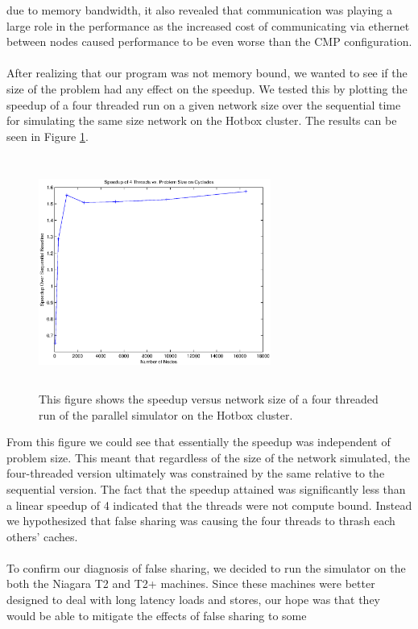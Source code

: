 \documentclass[twocolumn]{article}
\begin{document}
due to memory bandwidth, it also revealed that communication was playing a
large role in the performance as the increased cost of communicating via
ethernet between nodes caused performance to be even worse than the CMP
configuration.\\
~\\
After realizing that our program was not memory bound, we wanted to see if
the size of the problem had any effect on the speedup.  We tested this by
plotting the speedup of a four threaded run on a given network size over the
sequential time for simulating the same size network on the Hotbox
cluster.  The results can be seen in Figure \ref{probsize}.
\begin{figure}[h]
\centering
\includegraphics[height=3in,width=3in]{probsize.eps}
\caption{\label{probsize}This figure shows the speedup versus network size of a
four threaded run of the parallel simulator on the Hotbox cluster.}
\end{figure}
From this figure we could see that essentially the speedup was independent
of problem size.  This meant that regardless of the size of the network
simulated, the four-threaded version ultimately was constrained by the
same relative to the sequential version.  The fact that the speedup
attained was significantly less than a linear speedup of 4 indicated that
the threads were not compute bound.  Instead we hypothesized that false
sharing was causing the four threads to thrash each others' caches.\\
~\\
To confirm our diagnosis of false sharing, we decided to run the simulator
on the both the Niagara T2 and T2+ machines.  Since these machines were
better designed to deal with long latency loads and stores, our hope was
that they would be able to mitigate the effects of false sharing to some
\end{document}

